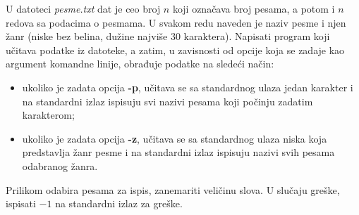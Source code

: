 \begin{Exercise}[label=A_o_1_4] 
U datoteci \textit{pesme.txt} dat je ceo broj $n$ koji označava broj pesama, a potom i $n$ redova sa podacima o pesmama. U svakom redu naveden je naziv pesme i njen žanr (niske bez belina, dužine najviše 30 karaktera). Napisati program koji učitava podatke iz datoteke, a zatim, u zavisnosti od opcije koja se zadaje kao argument komandne linije, obrađuje podatke na sledeći način: 
\begin{itemize}
\item ukoliko je zadata opcija \textbf{-p}, učitava se sa standardnog ulaza jedan karakter i na standardni izlaz ispisuju svi nazivi pesama koji počinju zadatim karakterom;
\item ukoliko je zadata opcija \textbf{-z}, učitava se sa standardnog ulaza niska koja predstavlja žanr pesme i na standardni izlaz ispisuju nazivi svih pesama odabranog žanra.
\end{itemize}

Prilikom odabira pesama za ispis, zanemariti veličinu slova. U slučaju greške, ispisati $-1$ na standardni izlaz za greške. \\


\end{Exercise}
